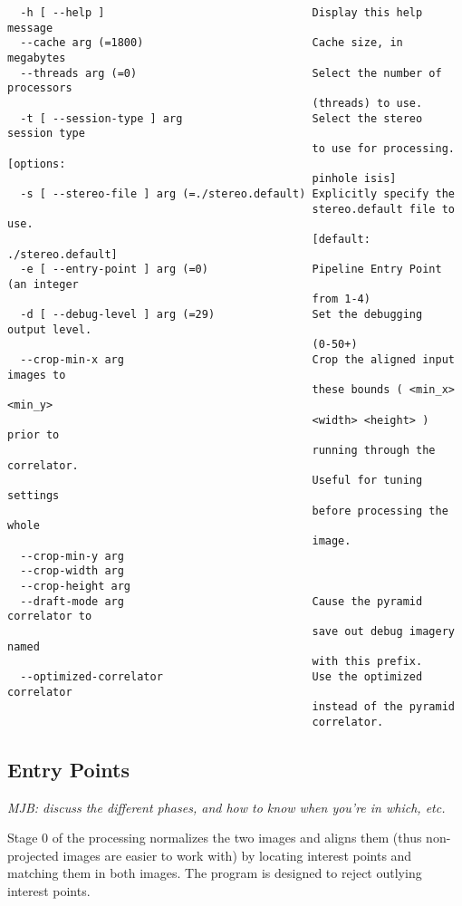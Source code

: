 \begin{verbatim}
  -h [ --help ]                                Display this help message
  --cache arg (=1800)                          Cache size, in megabytes
  --threads arg (=0)                           Select the number of processors 
                                               (threads) to use.
  -t [ --session-type ] arg                    Select the stereo session type 
                                               to use for processing. [options:
                                               pinhole isis]
  -s [ --stereo-file ] arg (=./stereo.default) Explicitly specify the 
                                               stereo.default file to use. 
                                               [default: ./stereo.default]
  -e [ --entry-point ] arg (=0)                Pipeline Entry Point (an integer
                                               from 1-4)
  -d [ --debug-level ] arg (=29)               Set the debugging output level. 
                                               (0-50+)
  --crop-min-x arg                             Crop the aligned input images to
                                               these bounds ( <min_x> <min_y> 
                                               <width> <height> ) prior to 
                                               running through the correlator. 
                                               Useful for tuning settings 
                                               before processing the whole 
                                               image.
  --crop-min-y arg
  --crop-width arg
  --crop-height arg
  --draft-mode arg                             Cause the pyramid correlator to 
                                               save out debug imagery named 
                                               with this prefix.
  --optimized-correlator                       Use the optimized correlator 
                                               instead of the pyramid 
                                               correlator.
\end{verbatim}

\subsection{Entry Points}
\label{entrypoints}

\emph{MJB: discuss the different phases, and how to know when you're
in which, etc.}

Stage 0 of the processing normalizes the two images and aligns them
(thus non-projected images are easier to work with) by locating
interest points and matching them in both images. The program is
designed to reject outlying interest points.

